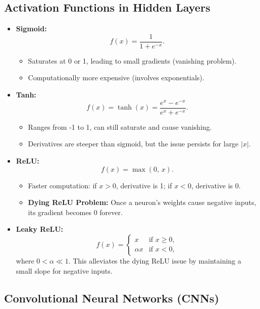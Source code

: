 \documentclass{article}
\begin{document}
\subsection{Activation Functions in Hidden Layers}
\begin{itemize}
    \item \textbf{Sigmoid:} 
    \[
    f(x) = \frac{1}{1 + e^{-x}}.
    \]
    \begin{itemize}
        \item Saturates at 0 or 1, leading to small gradients (vanishing problem).
        \item Computationally more expensive (involves exponentials).
    \end{itemize}
    \item \textbf{Tanh:}
    \[
    f(x) = \tanh(x) = \frac{e^{x} - e^{-x}}{e^{x} + e^{-x}}.
    \]
    \begin{itemize}
        \item Ranges from -1 to 1, can still saturate and cause vanishing.
        \item Derivatives are steeper than sigmoid, but the issue persists for large $|x|$.
    \end{itemize}
    \item \textbf{ReLU:}
    \[
    f(x) = \max(0,\,x).
    \]
    \begin{itemize}
        \item Faster computation: if $x > 0$, derivative is 1; if $x < 0$, derivative is 0.
        \item \textbf{Dying ReLU Problem:} Once a neuron's weights cause negative inputs, its gradient becomes 0 forever.
    \end{itemize}
    \item \textbf{Leaky ReLU:}
    \[
    f(x) = 
    \begin{cases}
       x & \text{if } x \ge 0,\\
       \alpha x & \text{if } x < 0,
    \end{cases}
    \]
    where $0 < \alpha \ll 1$. This alleviates the dying ReLU issue by maintaining a small slope for negative inputs.
\end{itemize}

\subsection{Convolutional Neural Networks (CNNs)}
\end{document}
